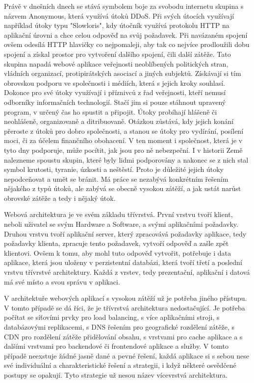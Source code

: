 \documentclass[12pt]{article}
\begin{document}
Právě v dnešních dnech se stává symbolem boje za svobodu internetu skupina s názvem Anonymous, která využívá útoků DDoS. Při svých útocích využívají například útoky typu "Slowloris", kdy útočník využívá protokolu HTTP na aplikační úrovni a chce celou odpověď na svůj požadavek. Při navázaném spojení ovšem odesílá HTTP hlavičky co nejpomaleji, aby tak co nejvíce prodloužili dobu spojení a získal prostor pro vytvoření dalšího spojení, čili další zátěže. Tato skupina napadá webové aplikace veřejnosti neoblíbených politických stran, vládních organizací, protipirátských asociací a jiných subjektů. Získávají si tím obrovskou podporu ve společnosti i médiích, která s jejich kroky souhlasí. Dokonce pro své útoky využívají i příznivců z řad veřejnosti, kteří nemusí odborníky informačních technologií. Stačí jim si pouze stáhnout upravený program, v určený čas ho spustit a připojit. Útoky probíhají hlášeně či neohlášeně, organizovaně a ditribuovaně. Otázkou zůstává, kdy jejich konání přeroste z útoků pro dobro společnosti, a stanou se útoky pro vydírání, posílení moci, či za účelem finančního obohacení. V ten moment i společnost, která je v tyto dny podporuje, může pocítit, jak jsou pro ně nebezpeční. I v historii Země nalezneme spoustu skupin, které byly lidmi podporovány a nakonec se z nich stal symbol krutosti, tyranie, úzkosti a neštěstí. Proto je důležité jejich útoky nepodceňovat a umět se bránit. Má práce se nezabývá konkrétním řešením nějakého z typů útoků, ale zabývá se obecně vysokou zátěží, a jak ustát narůst obrovské zátěže a tedy i nějaký útok.\cite{anonymous}




Webová architektura je ve svém základu třívrstvá. První vrstvu tvoří klient, neboli uživatel se svým Hardware a Software, a svými aplikačními požadavky. Druhou vrstvu tvoří aplikační server, který zpracovává požadavky aplikace, tedy požadavky klienta, zpracuje tento požadavek, vytvoří odpověď a zašle zpět klientovi. Ovšem k tomu, aby mohl tuto odpověď vytvořit, potřebuje i data aplikace, která jsou uloženy v perzistentní databázi, která tvoří třetí a poslední vrstvu třívrstvé architektury. Každá z vrstev, tedy prezentační, aplikační i datová má své místo a svou správu v aplikaci.\cite{tri-vrstvy}

\obrazek
{}

V architektuře webových aplikací s vysokou zátěží už je potřeba jiného přístupu. V tomto případě se dá říci, že je třívrstvá architektura nedostačující. Je potřeba počítat se síťovími prvky pro load balancing, s více aplikačními stroji, s databázovými replikacemi, s DNS řešením pro geografické rozdělení zátěže, s CDN pro rozdělení zátěže přidělování obsahu, s vrstvami pro cache aplikace a s dalšími vrstvami pro backendové či frontendové aplikace a služby. V tomto případě neexstuje žádné jasně dané a pevné řešení, každá aplikace si s sebou nese své individuální a charakteristické řešení a strategii, i když některé osvědčené postupy se opakují. Tyto strategie už nesou název vícevrstvá architektura.
\end{document}
